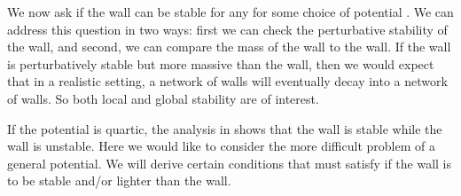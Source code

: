 \documentclass[a4paper,prd,nofootinbib,twocolumn,showpacs]{revtex4}
\begin{document}
We now ask if the \coordHE{} wall can be stable for any \coordHE{} for some
choice of potential \coordHE{}. We can address this question in
two ways: first we can check the perturbative stability of the
\coordHE{} wall, and second, we can compare the mass of the \coordHE{}
wall to the \coordHE{} wall. If the \coordHE{} wall is perturbatively
stable but more massive than the \coordHE{} wall, then we would
expect that in a realistic setting, a network of \coordHE{} walls
will eventually decay into a network of \coordHE{} walls. So both
local and global stability are of interest.

If the potential \coordHE{} is quartic, the analysis in 
\cite{PogVac00b,PogVac01,Vac01} shows that the \coordHE{} wall
is stable while the \coordHE{} wall is unstable. Here we would like
to consider the more difficult problem of a general potential.
We will derive certain conditions that \coordHE{} must satisfy
if the \coordHE{} wall is to be stable and/or lighter than the
\coordHE{} wall.
\end{document}
